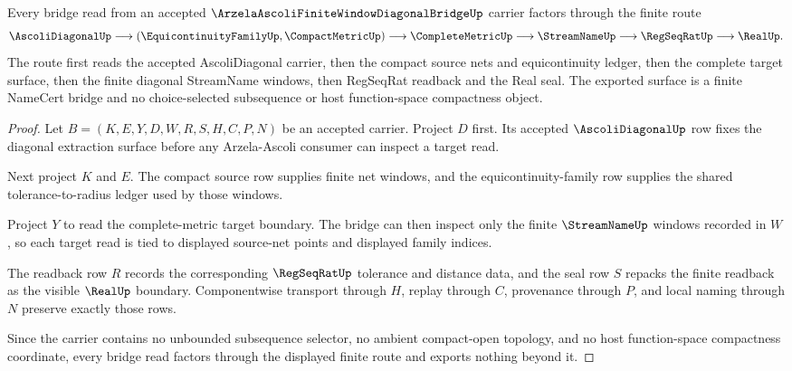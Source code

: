 \begin{theorem}
\label{thm:arzela-ascoli-finite-window-diagonal-route}
Every bridge read from an accepted
$\ArzelaAscoliFiniteWindowDiagonalBridgeUp$ carrier factors through the finite
route
$$
\AscoliDiagonalUp \longrightarrow
(\EquicontinuityFamilyUp,\CompactMetricUp) \longrightarrow
\CompleteMetricUp \longrightarrow
\StreamNameUp \longrightarrow
\RegSeqRatUp \longrightarrow
\RealUp .
$$
The route first reads the accepted AscoliDiagonal carrier, then the compact
source nets and equicontinuity ledger, then the complete target surface, then
the finite diagonal StreamName windows, then RegSeqRat readback and the Real
seal. The exported surface is a finite NameCert bridge and no choice-selected
subsequence or host function-space compactness object.
\end{theorem}
\begin{proof}
Let $B=(K,E,Y,D,W,R,S,H,C,P,N)$ be an accepted carrier. Project $D$ first. Its
accepted $\AscoliDiagonalUp$ row fixes the diagonal extraction surface before
any Arzela-Ascoli consumer can inspect a target read.

Next project $K$ and $E$. The compact source row supplies finite net windows,
and the equicontinuity-family row supplies the shared tolerance-to-radius
ledger used by those windows.

Project $Y$ to read the complete-metric target boundary. The bridge can then
inspect only the finite $\StreamNameUp$ windows recorded in $W$, so each target
read is tied to displayed source-net points and displayed family indices.

The readback row $R$ records the corresponding $\RegSeqRatUp$ tolerance and
distance data, and the seal row $S$ repacks the finite readback as the visible
$\RealUp$ boundary. Componentwise transport through $H$, replay through $C$,
provenance through $P$, and local naming through $N$ preserve exactly those
rows.

Since the carrier contains no unbounded subsequence selector, no ambient
compact-open topology, and no host function-space compactness coordinate,
every bridge read factors through the displayed finite route and exports
nothing beyond it.
\end{proof}


